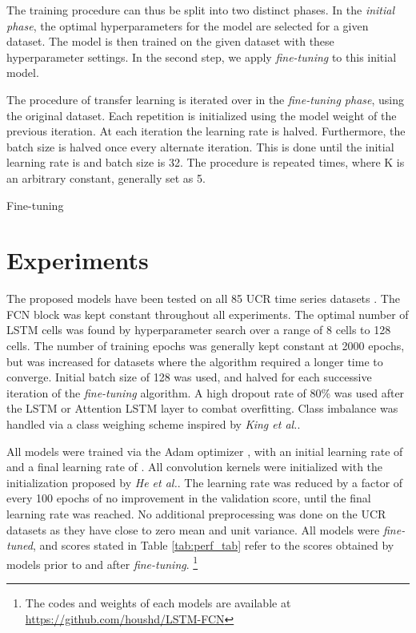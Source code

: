\documentclass[article]{IEEEtran}
\begin{document}
The training procedure can thus be split into two distinct phases. In the \textit{initial phase}\label{phase1}, the optimal hyperparameters for the model are selected for a given dataset. The model is then trained on the given dataset with these hyperparameter settings. In the second step, we apply \textit{fine-tuning} to this initial model.

The procedure of transfer learning is iterated over in the \textit{fine-tuning phase}\label{phase2}, using the original dataset. Each repetition is initialized using the model weight of the previous iteration. At each iteration the learning rate is halved. Furthermore, the batch size is halved once every alternate iteration. This is done until the initial learning rate is  and batch size is 32. The procedure is repeated  times, where K is an arbitrary constant, generally set as 5.

\begin{algorithm}
\begin{algorithmic}[1]
\caption{Fine-tuning}\label{finetuning}
\For {}
\State 
\State 
\State 
\State 
\State 
\State 
\EndFor
\end{algorithmic}
\end{algorithm} 
\section{Experiments}
\label{Experiments}
The proposed models have been tested on all 85 UCR time series datasets \cite{UCRArchive}. The FCN block was kept constant throughout all experiments. The optimal number of LSTM cells was found by hyperparameter search over a range of 8 cells to 128 cells. The number of training epochs was generally kept constant at 2000 epochs, but was increased for datasets where the algorithm required a longer time to converge. Initial batch size of 128 was used, and halved for each successive iteration of the \textit{fine-tuning} algorithm. A high dropout rate of 80\% was used after the LSTM or Attention LSTM layer to combat overfitting. Class imbalance was handled via a class weighing scheme inspired by \textit{King et al.}\cite{king2001logistic}.

All models were trained via the Adam optimizer \cite{kingma2014adam}, with an initial learning rate of  and a final learning rate of . All convolution kernels were initialized with the initialization proposed by \textit{He et al.}\cite{he2015delving}. The learning rate was reduced by a factor of  every 100 epochs of no improvement in the validation score, until the final learning rate was reached. No additional preprocessing was done on the UCR datasets as they have close to zero mean and unit variance. All models were \textit{fine-tuned}, and scores stated in Table \ref{tab:perf_tab} refer to the scores obtained by models prior to and after \textit{fine-tuning}. \footnote{The codes and weights of each models are available at \href{https://github.com/houshd/LSTM-FCN}{https://github.com/houshd/LSTM-FCN}}
 
\end{document}
